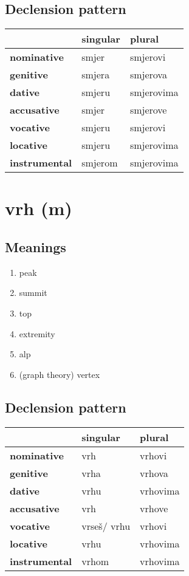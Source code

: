 \subsection*{Declension pattern}
\begin{tabularx}{\linewidth}{Xll}
\toprule
{} & singular &      plural \\
\midrule
\textbf{nominative  } &    smjer &    smjerovi \\
\textbf{genitive    } &   smjera &    smjerova \\
\textbf{dative      } &   smjeru &  smjerovima \\
\textbf{accusative  } &    smjer &    smjerove \\
\textbf{vocative    } &   smjeru &    smjerovi \\
\textbf{locative    } &   smjeru &  smjerovima \\
\textbf{instrumental} &  smjerom &  smjerovima \\
\bottomrule
\end{tabularx}

\filbreak
\section{vrh (m)}
\subsection*{Meanings}
\begin{enumerate}
\item peak
\item summit
\item top
\item extremity
\item alp
\item (graph theory) vertex
\end{enumerate}
\subsection*{Declension pattern}
\begin{tabularx}{\linewidth}{Xll}
\toprule
{} &     singular &    plural \\
\midrule
\textbf{nominative  } &          vrh &   vrhovi \\
\textbf{genitive    } &        vrha &    vrhova \\
\textbf{dative      } &         vrhu &  vrhovima \\
\textbf{accusative  } &          vrh &    vrhove \\
\textbf{vocative    } &  vrseš/ vrhu &    vrhovi \\
\textbf{locative    } &         vrhu &  vrhovima \\
\textbf{instrumental} &        vrhom &  vrhovima \\
\bottomrule
\end{tabularx}

